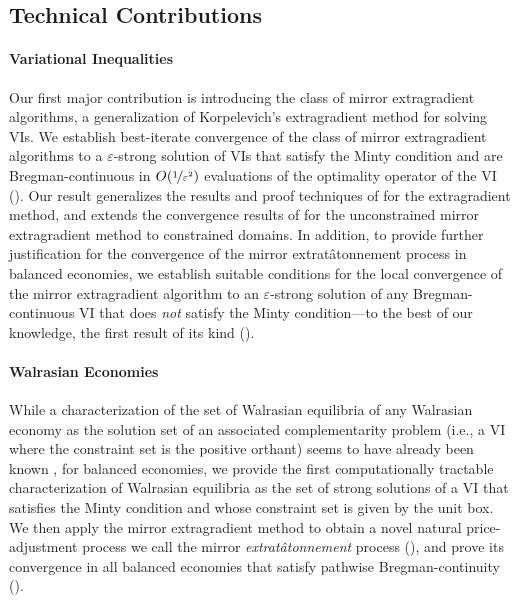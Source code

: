 \subsection{Technical Contributions}

\paragraph{Variational Inequalities}
Our first major contribution is introducing the class of mirror extragradient algorithms, a generalization of Korpelevich's extragradient method \cite{korpelevich1976extragradient} for solving VIs. We establish best-iterate convergence of the class of mirror extragradient algorithms to a $\varepsilon$-strong solution of VIs that satisfy the Minty condition and are Bregman-continuous in $O(\nicefrac{1}{\varepsilon^2})$ evaluations of the optimality operator of the VI (). Our result generalizes the results and proof techniques of \citet{huang2023beyond} for the extragradient method, and extends the convergence results of \citet{zhang2023mirror} for the unconstrained mirror extragradient method to constrained domains. In addition, to provide further justification for the convergence of the mirror extrat\^atonnement process in balanced economies, we establish suitable conditions for the local convergence of the mirror extragradient algorithm to an $\varepsilon$-strong solution of any Bregman-continuous VI that does \emph{not\/} satisfy the Minty condition---to the best of our knowledge, the first result of its kind ().



\paragraph{Walrasian Economies}

While a characterization of the set of Walrasian equilibria of any Walrasian economy as the solution set of an associated complementarity problem (i.e., a VI where the constraint set is the positive orthant) seems to have already been known \cite{dafermos1990exchange}, for balanced economies, we provide the first computationally tractable characterization of Walrasian equilibria as the set of strong solutions of a VI that satisfies the Minty condition and whose constraint set is given by the unit box. We then apply the mirror extragradient method to obtain a novel natural price-adjustment process we call the mirror \emph{extrat\^atonnement\/} process (), and prove its convergence in all balanced economies that satisfy pathwise Bregman-continuity ().

